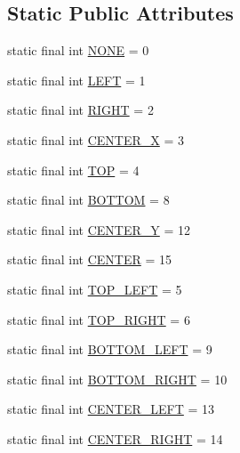 \subsection*{Static Public Attributes}
\begin{DoxyCompactItemize}
\item 
static final int \hyperlink{interfacehype_1_1util_1_1_h_constants_a5c1900304a6334c7abdd43f3d35445fc}{N\-O\-N\-E} = 0
\item 
static final int \hyperlink{interfacehype_1_1util_1_1_h_constants_a327c09c253ba7806b2991e3982146c51}{L\-E\-F\-T} = 1
\item 
static final int \hyperlink{interfacehype_1_1util_1_1_h_constants_adbd10d38cf301e7e96ed683a673651aa}{R\-I\-G\-H\-T} = 2
\item 
static final int \hyperlink{interfacehype_1_1util_1_1_h_constants_a0ee9fd0b109b018fd93c51310f195876}{C\-E\-N\-T\-E\-R\-\_\-\-X} = 3
\item 
static final int \hyperlink{interfacehype_1_1util_1_1_h_constants_adbfa4bb9133ee25754ded8f3db33f0be}{T\-O\-P} = 4
\item 
static final int \hyperlink{interfacehype_1_1util_1_1_h_constants_ae97c94f8c267578bc5cb67b5b2a37719}{B\-O\-T\-T\-O\-M} = 8
\item 
static final int \hyperlink{interfacehype_1_1util_1_1_h_constants_ad4fdffdcc29dbd33b354e3c650e15762}{C\-E\-N\-T\-E\-R\-\_\-\-Y} = 12
\item 
static final int \hyperlink{interfacehype_1_1util_1_1_h_constants_a310b354e029db1ac74aa090414e07b11}{C\-E\-N\-T\-E\-R} = 15
\item 
static final int \hyperlink{interfacehype_1_1util_1_1_h_constants_a49179d38e7d0cb1c0499e717565427e0}{T\-O\-P\-\_\-\-L\-E\-F\-T} = 5
\item 
static final int \hyperlink{interfacehype_1_1util_1_1_h_constants_afb0f2c47b1e7b887005393f0b8151563}{T\-O\-P\-\_\-\-R\-I\-G\-H\-T} = 6
\item 
static final int \hyperlink{interfacehype_1_1util_1_1_h_constants_a19fd6780ac656fcace641b57e45edcf2}{B\-O\-T\-T\-O\-M\-\_\-\-L\-E\-F\-T} = 9
\item 
static final int \hyperlink{interfacehype_1_1util_1_1_h_constants_a0da056b42c443a89a8f2cfc6ec28ae00}{B\-O\-T\-T\-O\-M\-\_\-\-R\-I\-G\-H\-T} = 10
\item 
static final int \hyperlink{interfacehype_1_1util_1_1_h_constants_a066566d911f32f635bbef9af1ae3c1df}{C\-E\-N\-T\-E\-R\-\_\-\-L\-E\-F\-T} = 13
\item 
static final int \hyperlink{interfacehype_1_1util_1_1_h_constants_a0da49828ca4be26c0326eda84bcba534}{C\-E\-N\-T\-E\-R\-\_\-\-R\-I\-G\-H\-T} = 14

\end{DoxyCompactItemize}
